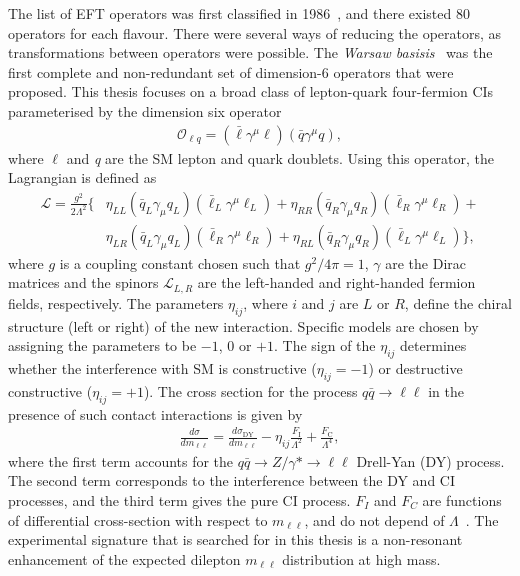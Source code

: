The list of EFT operators was first classified in 1986~\cite{Buchmuller:163116}, and there existed 80 operators for each flavour. There were several ways of reducing the operators, as transformations between operators were possible. The \emph{Warsaw basisis}~\cite{Grzadkowski_2010} was the first complete and non-redundant set of dimension-6 operators that were proposed. This thesis focuses on a broad class of lepton-quark four-fermion CIs parameterised by the dimension six operator~\cite{de_Blas_2013}
\begin{equation}
    \label{eq:CIop}
    \begin{aligned}
        \mathcal{O}_{\ell q} = (\bar{\ell}\gamma^\mu \ell)(\bar{q}\gamma^\mu q),
     \end{aligned}
\end{equation}
where $\ell$ and \emph{q} are the SM lepton and quark doublets. Using this operator, the Lagrangian is defined as 
\begin{equation}
\label{eq:CIlagrangian}
\begin{aligned}
\mathcal L = \frac{g^2}{2\Lambda^2} \{
    &\eta_{LL}\left(\bar{q}_L\gamma_{\mu}q_L\right)\left(\bar{\ell}_L\gamma^{\mu}\ell_L\right) + \eta_{RR}\left(\bar{q}_R\gamma_{\mu}q_R\right)\left(\bar{\ell}_R\gamma^{\mu}\ell_R\right) + \\
    &\eta_{LR}\left(\bar{q}_L\gamma_{\mu}q_L\right)\left(\bar{\ell}_R\gamma^{\mu}\ell_R\right) + \eta_{RL}\left(\bar{q}_R\gamma_{\mu}q_R\right)\left(\bar{\ell}_L\gamma^{\mu}\ell_L\right)\},
\end{aligned}
\end{equation}
where $g$ is a coupling constant chosen such that $g^2/4\pi = 1$, $\gamma$ are the Dirac matrices and the spinors $\mathcal{L}_{L,R}$ are the left-handed and right-handed fermion fields, respectively. The parameters $\eta_{ij}$, where $i$ and $j$ are $L$ or $R$, define the chiral structure (left or right) of the new interaction. Specific models are chosen by assigning the parameters to be $-1$, $0$ or $+1$. The sign of the $\eta_{ij}$ determines whether the interference with SM is constructive ($\eta_{ij} = -1$) or destructive constructive ($\eta_{ij} = +1$). The cross section for the process $q\bar{q} \rightarrow \ell\ell$ in the presence of such contact interactions is given by
\begin{eqnarray}
    \frac{d\sigma}{dm_{\ell\ell}} = \frac{d\sigma_\textrm{DY}}{dm_{\ell\ell}} - \eta_{ij}\frac{F_\textrm{I}}{\Lambda^2} + \frac{F_\textrm{C}}{\Lambda^4},
    \label{eq:cross_section_CI}
\end{eqnarray}
where the first term accounts for the $q\bar{q} \rightarrow Z/\gamma* \rightarrow \ell\ell$ Drell-Yan (DY) process. The second term corresponds to the interference between the DY and CI processes, and the third term gives the pure CI process. $F_I$ and $F_C$ are functions of differential cross-section with respect to $m_{\ell\ell}$, and do not depend of $\Lambda$~\cite{Eichten:1984eu}. The experimental signature that is searched for in this thesis is a non-resonant enhancement of the expected dilepton $m_{\ell\ell}$ distribution at high mass. 

